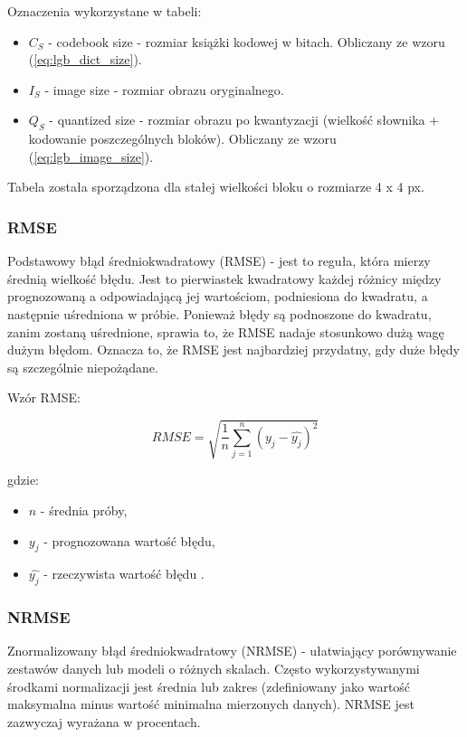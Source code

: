 \documentclass{article}
\begin{document}
Oznaczenia wykorzystane w tabeli:
\begin{itemize}[label=]
	\item $C_S$ - codebook size - rozmiar książki kodowej w bitach. Obliczany ze wzoru (\ref{eq:lgb_dict_size}).
    \item $I_S$ - image size - rozmiar obrazu oryginalnego.
		\item $Q_S$ - quantized size - rozmiar obrazu po kwantyzacji (wielkość słownika + kodowanie poszczególnych bloków). Obliczany ze wzoru (\ref{eq:lgb_image_size}).
\end{itemize}

Tabela została sporządzona dla stałej wielkości bloku o rozmiarze 4 x 4 px.

\subsubsection{RMSE}

Podstawowy błąd średniokwadratowy (RMSE) - jest to reguła, która mierzy średnią wielkość błędu. Jest to pierwiastek kwadratowy każdej różnicy między prognozowaną a odpowiadającą jej wartościom, podniesiona do kwadratu, a następnie uśredniona w próbie. Ponieważ błędy są podnoszone do kwadratu, zanim zostaną uśrednione, sprawia to, że RMSE nadaje stosunkowo dużą wagę dużym błędom. Oznacza to, że RMSE jest najbardziej przydatny, gdy duże błędy są szczególnie niepożądane.

Wzór RMSE:

\begin{equation}
RMSE = \sqrt{\frac{1}{n} \sum_{j=1}^{n} (y_{j} - \hat{y_{j}} )^2}
\end{equation}

gdzie:
\begin{itemize}[label=]
    \item $n$ - średnia próby,
    \item $y_{j}$ - prognozowana wartość błędu,
    \item $\hat{y_{j}}$ - rzeczywista wartość błędu \cite{rmse}.
\end{itemize}

\subsubsection{NRMSE}

Znormalizowany błąd średniokwadratowy (NRMSE) - ułatwiający porównywanie zestawów danych lub modeli o różnych skalach. Często wykorzystywanymi środkami normalizacji jest średnia lub zakres (zdefiniowany jako wartość maksymalna minus wartość minimalna mierzonych danych). NRMSE jest zazwyczaj wyrażana w procentach.
\end{document}
